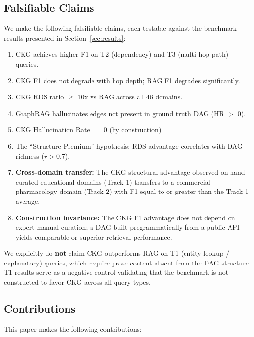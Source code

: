 \subsection{Falsifiable Claims}\label{sec:claims}

We make the following falsifiable claims, each testable against the benchmark
results presented in Section~\ref{sec:results}:

\begin{enumerate}
  \item CKG achieves higher F1 on T2 (dependency) and T3 (multi-hop path) queries.
  \item CKG F1 does not degrade with hop depth; RAG F1 degrades significantly.
  \item CKG RDS ratio $\geq$ 10x vs RAG across all 46 domains.
  \item GraphRAG hallucinates edges not present in ground truth DAG (HR $>$ 0).
  \item CKG Hallucination Rate $=$ 0 (by construction).
  \item The ``Structure Premium'' hypothesis: RDS advantage correlates with DAG richness ($r > 0.7$).
  \item \textbf{Cross-domain transfer:} The CKG structural advantage observed
    on hand-curated educational domains (Track 1) transfers to a commercial
    pharmacology domain (Track 2) with F1 equal to or greater than the Track 1
    average.
  \item \textbf{Construction invariance:} The CKG F1 advantage does not depend
    on expert manual curation; a DAG built programmatically from a public API
    yields comparable or superior retrieval performance.
\end{enumerate}

\noindent We explicitly do \textbf{not} claim CKG outperforms RAG on T1 (entity lookup /
explanatory) queries, which require prose content absent from the DAG structure.
T1 results serve as a negative control validating that the benchmark is not
constructed to favor CKG across all query types.

\subsection{Contributions}\label{sec:contributions}

This paper makes the following contributions:

